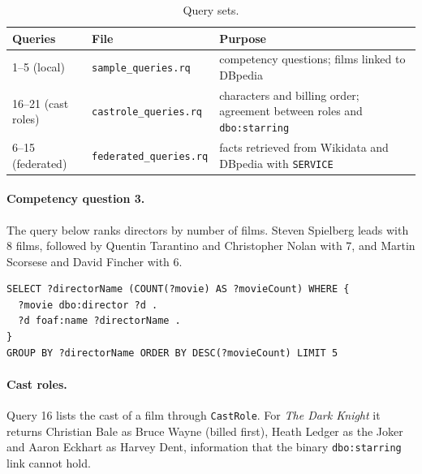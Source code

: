 \documentclass[11pt,a4paper]{article}
\newcommand{\code}[1]{\texttt{#1}}
\begin{document}
\begin{table}[H]
\centering\small
\caption{Query sets.}\label{tab:queries}
\begin{tabularx}{\textwidth}{@{}llX@{}}
\toprule
Queries & File & Purpose \\
\midrule
1--5 (local) & \code{sample\_queries.rq} & competency questions; films linked to DBpedia \\
16--21 (cast roles) & \code{castrole\_queries.rq} & characters and billing order; agreement between roles and \code{dbo:starring} \\
6--15 (federated) & \code{federated\_queries.rq} & facts retrieved from Wikidata and DBpedia with \code{SERVICE} \\
\bottomrule
\end{tabularx}
\end{table}

\paragraph{Competency question 3.} The query below ranks directors by number of films. Steven Spielberg leads with 8 films, followed by Quentin Tarantino and Christopher Nolan with 7, and Martin Scorsese and David Fincher with 6.
\par\noindent\begin{minipage}{\linewidth}\begin{lstlisting}[language=sparql]
SELECT ?directorName (COUNT(?movie) AS ?movieCount) WHERE {
  ?movie dbo:director ?d .
  ?d foaf:name ?directorName .
}
GROUP BY ?directorName ORDER BY DESC(?movieCount) LIMIT 5
\end{lstlisting}\end{minipage}\par

\paragraph{Cast roles.} Query 16 lists the cast of a film through \code{CastRole}. For \emph{The Dark Knight} it returns Christian Bale as Bruce Wayne (billed first), Heath Ledger as the Joker and Aaron Eckhart as Harvey Dent, information that the binary \code{dbo:starring} link cannot hold.
\end{document}
